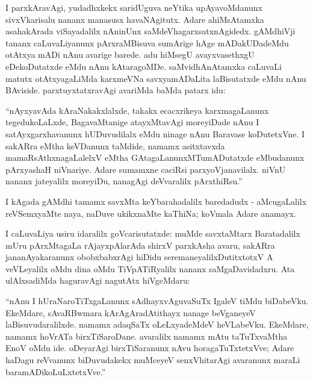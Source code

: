 I parxkAravAgi, yudadhxkekx saridUguva neYtika upAyavoMdanunx sivxVkarisalu nananx manasusx havaNAgitutx. Adare ahiMsAtamxka asahakArada viSayadalilx nAninUnx saMdeVhagarxsatxnAgidedx. gAMdhiVji tananx caLuvaLiyanunx pArxraMBisuva sumArige hAge mADakUDadeMdu otAtxya mADi nAnu avarige barede. adu hiMsegU avayxvasethxgU eDekoDutatxde eMdu nAnu kAtaragoMDe. saMvidhAnAtamxka caLuvaLi matutx otAtxyagaLiMda karxmeVNa savxyamADaLita laBisutatxde eMdu nAnu BAviside. parxtuyxtatxravAgi avariMda baMda patarx idu:

\begin{minipage}[c]{.5cm}
\quad 
\end{minipage}
\begin{minipage}[c]{8.5cm}
``nAyxyavAda kAraNakakxlalxde, takakx ecacxrikeya karxmagaLanunx tegedukoLaLxde, BagavaMtanige atayxMtavAgi moreyiDade nAnu I satAyxgarxhavanunx hUDuvudilalx eMdu ninage nAnu Baravase koDutetxVne. I sakARra eMtha keVDanunx taMdide, namamx asitxtavxda mamaRsAthxnagaLalelxV eMtha GAtagaLanunxMTumADutatxde eMbudanunx pArxyashaH niVnariye. Adare sumamxne caciRsi parxyoVjanavilalx. niVnU nananx jateyalilx moreyiDu, nanagAgi deVvaralilx pArxthiRsu.''
\end{minipage}

I kAgada gAMdhi tamamx savxMta keYbarahadalilx baredadudx - aMcugaLalilx reVSemxyaMte naya, naDuve ukikxnaMte kaThiNa; koVmala Adare anamayx.

I caLuvaLiya usiru idaralilx goVcarisutatxde: muMde savxtaMtarx Baratadalilx mUru pArxMtagaLa rAjayxpAlarAda shirxV parxkAsha avaru, sakARra jananAyakaranunx obobxbabxrAgi hiDidu seremaneyalilxDutitxtotxV A veVLeyalilx oMdu dina oMdu TiVpATiRyalilx nananx saMgaDavidadxru. Ata ulAlxsadiMda haguravAgi nagutAtx hiVgeMdaru:

\begin{minipage}[c]{.5cm}
\quad 
\end{minipage}
\begin{minipage}[c]{8.5cm}
``nAnu I hUraNaroTiTxgaLanunx sAdhayxvAguvaSuTx IgaleV tiMdu biDabeVku. EkeMdare, sAvaRBwmara kArAgAradAtithayx nanage beVganeyeV laBisuvudaralilxde. namamx adaqSaTx oLeLxyadeMdeV heVLabeVku. EkeMdare, namamx hoVrATa birxTiSaroDane. avaralilx namamx mAtu taTuTxvaMtha EnoV oMdu ide. oDeyarAgi birxTiSaranunx nAvu horagaTuTxtetxVve; Adare haDagu reVvanunx biDuvudakekx muMceyeV senxVhitarAgi avaranunx maraLi baramADikoLuLxtetxVve.''
\end{minipage}

